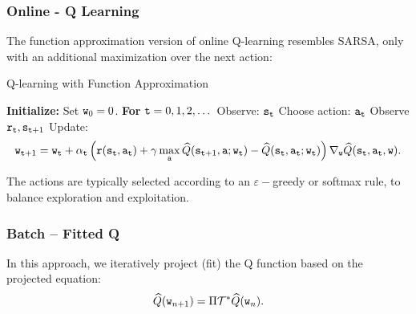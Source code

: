 
\subsubsection{Online - Q Learning}
The function approximation version of online Q-learning resembles SARSA, only with an additional maximization over the next action:

\begin{algorithm}[H]
\caption{Q-learning with Function Approximation}
\begin{algorithmic}[1]
\State \textbf{Initialize:} Set ${\tt w}_0 = 0$.
\State \textbf{For} {${\tt t} = 0, 1, 2, \dots$}
    \State \quad Observe: ${\tt s}_{\tt t}$ 
    \State \quad Choose action: ${\tt a}_{\tt t}$ 
    \State \quad Observe ${\tt r}_{\tt t}, {\tt s}_{{\tt t}+1}$
    \State \quad Update:
    \begin{equation*}
    {\tt w}_{{\tt t}+1} = {\tt w}_{\tt t} + \alpha_{\tt t} \left( {\tt r}({\tt s}_{\tt t},{\tt a}_{\tt t}) + \gamma \max_{\tt a} \widehat{Q}({\tt s}_{{\tt t}+1},{\tt a};{\tt w}_{\tt t}) - \widehat{Q}({\tt s}_{{\tt t}},{\tt a}_{{\tt t}}; {\tt w}_{\tt t}) \right) \nabla_{{\tt w}} \widehat{Q}({\tt s}_{\tt t},{\tt a}_{\tt t},{\tt w}).
\end{equation*}
\end{algorithmic}
\end{algorithm}

The actions are typically selected according to an $\varepsilon-$greedy or softmax rule, to balance exploration and exploitation.

\subsubsection{Batch -- Fitted Q}

In this approach, we iteratively project (fit) the Q function based on the projected equation:
\begin{equation*}
    \widehat{Q}({\tt w}_{n+1}) = \Pi \mathcal{T}^* \widehat{Q}({\tt w}_{n}).
\end{equation*}

